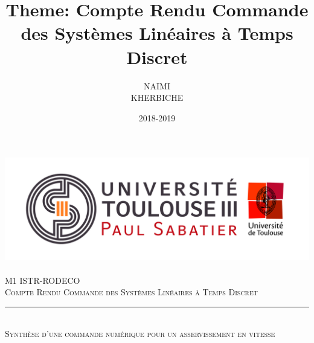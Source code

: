 \documentclass[12pt, a4paper, openany]{report}
\title{Theme: Compte Rendu Commande des Systèmes Linéaires à Temps Discret}
\author{NAIMI \bsc{Nabil} \\ KHERBICHE \bsc{Ali}}
\date{2018-2019}
\newcommand{\HRule}{\rule{\linewidth}{0.5mm}}
\begin{document}
\makeatletter
\begin{titlepage}
\begin{sffamily}
\begin{center}
    \includegraphics[scale=0.5]{Logo_UT3.jpg}~\\[1cm]
    \textsc{\LARGE M1 ISTR-RODECO  }\\[1cm]
    \textsc{\Large Compte Rendu Commande des Systèmes Linéaires à Temps Discret}\\[1cm]
    \HRule \\[0.4cm] %
    { \huge  \textsc {Synthèse d'une commande numérique pour un asservissement en vitesse \\[0.4cm] }}


\end{center}
\end{sffamily}
\end{titlepage}
\end{document}
